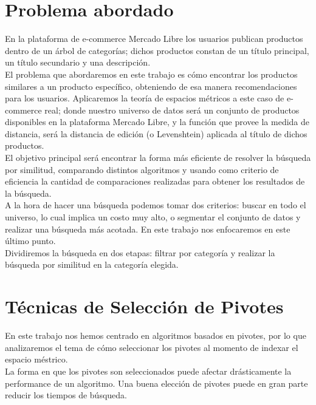 \section{Problema abordado}

En la plataforma de e-commerce Mercado Libre los usuarios publican productos dentro de un \'arbol de categor\'ias; dichos productos constan de un t\'itulo principal, un t\'itulo secundario y una descripci\'on.\\

El problema que abordaremos en este trabajo es c\'omo encontrar los productos similares a un producto espec\'ifico, obteniendo de esa manera recomendaciones para los usuarios. Aplicaremos la teor\'ia de espacios m\'etricos a este caso de e-commerce real; donde nuestro universo de datos ser\'a un conjunto de productos disponibles en la plataforma Mercado Libre, y la funci\'on que provee la medida de distancia, ser\'a la distancia de edici\'on (o Levenshtein) aplicada al t\'itulo de dichos productos.\\

El objetivo principal ser\'a encontrar la forma m\'as eficiente de resolver la b\'usqueda por similitud, comparando distintos algoritmos y usando como criterio de eficiencia la cantidad de comparaciones realizadas para obtener los resultados de la b\'usqueda.\\

A la hora de hacer una b\'usqueda podemos tomar dos criterios: buscar en todo el universo, lo cual implica un costo muy alto, o segmentar el conjunto de datos y realizar una b\'usqueda m\'as acotada. En este trabajo nos enfocaremos en este \'ultimo punto.\\

Dividiremos la b\'usqueda en dos etapas: filtrar por categor\'ia y realizar la b\'usqueda por similitud en la categor\'ia elegida.\\

\section{T\'ecnicas de Selecci\'on de Pivotes}
En este trabajo nos hemos centrado en algoritmos basados en pivotes, por lo que analizaremos el tema de c\'omo seleccionar los pivotes al momento de indexar el espacio m\'estrico.\\

La forma en que los pivotes son seleccionados puede afectar dr\'asticamente la performance de un algoritmo. Una buena elecci\'on de pivotes puede en gran parte reducir los tiempos de b\'usqueda.

